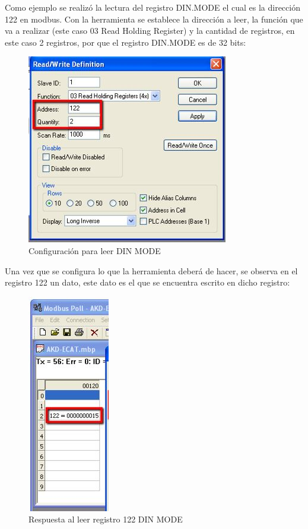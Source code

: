 \documentclass[12pt,titlepage]{article}
\begin{document}
Como ejemplo se realizó la lectura del registro DIN.MODE el cual es la dirección 122 en modbus. Con la herramienta se establece la dirección a leer, la función que va a realizar (este caso 03 Read Holding Register) y la cantidad de registros, en este caso 2 registros, por que el registro DIN.MODE es de 32 bits: \\ 
 
 \begin{figure}[htbp]
\hspace*{4.6cm} 
\includegraphics[scale=0.88]{poll1}
\caption{Configuración para leer DIN MODE}
\end{figure}
\newpage
Una vez que se configura lo que la herramienta deberá de hacer, se observa  en el registro 122  un dato, este dato es el que se encuentra escrito en dicho registro: \\ 
 \begin{figure}[htbp]
\hspace*{6.6cm} 
\includegraphics[scale=0.68]{response_poll}
\caption{Respuesta al leer registro 122 DIN MODE}
\end{figure}
\end{document}
